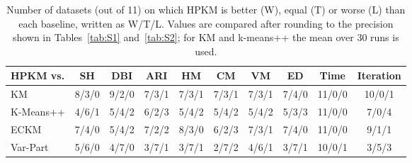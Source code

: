 \begin{table}[htbp]
\centering
\caption{Number of datasets (out of 11) on which HPKM is better (W), equal (T) or worse (L) than each baseline, written as W/T/L. Values are compared after rounding to the precision shown in Tables~\ref{tab:S1} and~\ref{tab:S2}; for KM and k-means++ the mean over 30 runs is used.}
\label{tab:S3}
\small
\begin{tabular}{|l|ccccccccc|}
\hline
HPKM vs. & SH & DBI & ARI & HM & CM & VM & ED & Time & Iteration \\
\hline
KM & 8/3/0 & 9/2/0 & 7/3/1 & 7/3/1 & 7/3/1 & 7/3/1 & 7/4/0 & 11/0/0 & 10/0/1 \\
K-Means++ & 4/6/1 & 5/4/2 & 6/2/3 & 5/4/2 & 5/4/2 & 5/4/2 & 5/3/3 & 11/0/0 & 7/0/4 \\
ECKM & 7/4/0 & 5/4/2 & 7/2/2 & 8/3/0 & 6/2/3 & 7/3/1 & 7/4/0 & 11/0/0 & 9/1/1 \\
Var-Part & 5/6/0 & 4/7/0 & 3/7/1 & 3/7/1 & 2/7/2 & 4/6/1 & 3/7/1 & 10/0/1 & 3/5/3 \\
\hline
\end{tabular}
\end{table}

